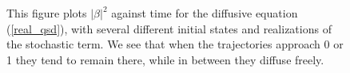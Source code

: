 \eject
\vfil

\begin{figure}
\begin{center}
\label{fig4}
\end{center}
\caption{This figure plots $|\beta|^2$ against time for the diffusive
equation (\ref{real_qsd}), with several different initial states and
realizations of the stochastic term.  We see that when the trajectories
approach 0 or 1 they tend to remain there, while in between they diffuse
freely.}
\end{figure}




